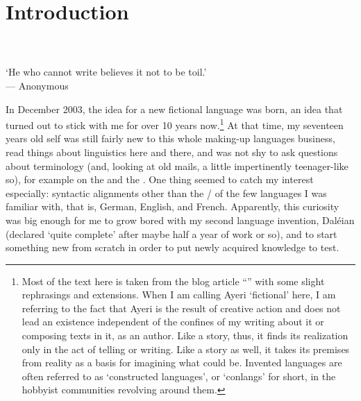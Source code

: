 \setcounter{chapter}{-1}
\chapter{Introduction}
\label{ch:introduction}

\begin{minipage}{\linewidth}\raggedleft\smaller
{}\\
\\
`He who cannot write believes it not to be toil.'\\
--- Anonymous\footnotemark
\end{minipage}\bigskip\bigskip


\noindent In December 2003, the idea for a new fictional language was born, an
idea that turned out to stick with me for over 10 years now.\footnote{Most of
the text here is taken from the blog article
``'' \parencite{benung:happybirthday} with some
slight rephrasings and extensions. When I am calling Ayeri `fictional' here, I
am referring to the fact that Ayeri is the result of creative action and does
not lead an existence independent of the confines of my writing about it or
composing texts in it, as an author. Like a story, thus, it finds its
realization only in the act of telling or writing. Like a story as well, it
takes its premises from reality as a basis for imagining what could be.
Invented languages are often referred to as `constructed languages', or
`conlangs' for short, in the hobbyist communities revolving around them.} At
that time, my seventeen years old self was still fairly new to this whole
making-up languages business, read things about linguistics here and there, and
was not shy to ask questions about terminology (and, looking at old mails, a
little impertinently teenager-like so), for example on the
 and the . One thing seemed to catch my
interest especially: syntactic alignments other than the \Nom{}/\Acc{} of the
few languages I was familiar with, that is, German, English, and French.
Apparently, this curiosity was big enough for me to grow bored with my second
language invention, Daléian (declared `quite complete' after maybe half a year
of work or so), and to start something new from scratch in order to put newly
acquired knowledge to test.


